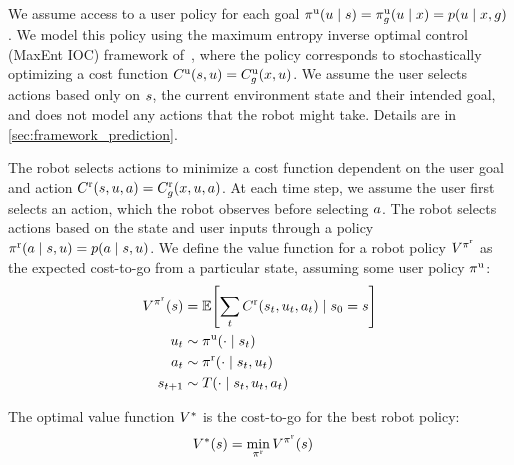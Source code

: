 We assume access to a user policy for each goal $\pi^{\text{u}}(u \mid s) = \pi^{\text{u}}_g(u \mid x) = p(u \mid x, g)$. We model this policy using the maximum entropy inverse optimal control (MaxEnt IOC) framework of~\citet{ziebart_2008}, where the policy corresponds to stochastically optimizing a cost function $C^{\text{u}}(s, u) = C^{\text{u}}_g(x, u)$. We assume the user selects actions based only on $s$, the current environment state and their intended goal, and does not model any actions that the robot might take. Details are in \cref{sec:framework_prediction}.

The robot selects actions to minimize a cost function dependent on the user goal and action $C^{\text{r}}(s, u, a) = C^{\text{r}}_g(x, u, a)$. At each time step, we assume the user first selects an action, which the robot observes before selecting $a$. The robot selects actions based on the state and user inputs through a policy $\pi^{\text{r}}(a \mid s, u) = p(a \mid s, u)$. We define the value function for a robot policy $V^{\pi^{\text{r}}}$ as the expected cost-to-go from a particular state, assuming some user policy $\pi^{\text{u}}$:
\begin{align*}
  V^{\pi^{\text{r}}}(s) &= \mathbb{E}\!\left[\sum_{t} C^{\text{r}}(s_t, u_t, a_t) \mid s_0 = s\right]\\
  u_t &\sim \pi^{\text{u}}(\cdot \mid s_t)\\
  a_t &\sim \pi^{\text{r}}(\cdot \mid s_t, u_t)\\
  s_{t+1} &\sim T(\cdot \mid s_t, u_t, a_t)
\end{align*}

The optimal value function $V^{*}$ is the cost-to-go for the best robot policy:
\begin{align*}
  V^{*}(s) &= \min_{\pi^{\text{r}}} V^{\pi^{\text{r}}}(s)
\end{align*}


